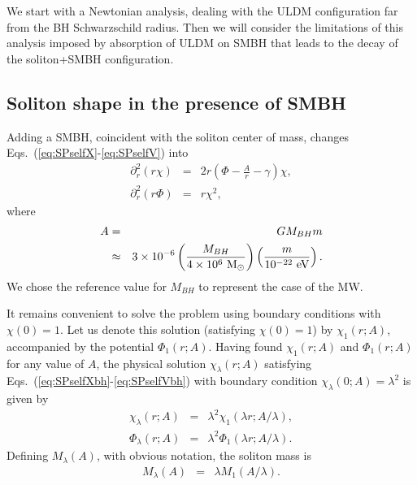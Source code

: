 \documentclass[aps,prd,floats,superscriptaddress,showpacs,nofootinbib,twocolumn,preprintnumbers]{revtex4-1}%
\def\be{\begin{eqnarray}}
\def\ee{\end{eqnarray}}
\def\no{\nonumber}
\begin{document}
\begin{appendix}
We start with a Newtonian analysis, dealing with the ULDM configuration
far from the BH Schwarzschild radius. Then we will consider the
limitations of this analysis imposed by absorption of ULDM on SMBH
that leads to the decay of the soliton+SMBH configuration.


\subsection{Soliton shape in the presence of SMBH }\label{ss:Newtonian}

Adding a SMBH, coincident with the soliton center of mass, changes Eqs.~(\ref{eq:SPselfX}-\ref{eq:SPselfV}) into
%
\be\partial_r^2\left(r\chi\right)&=&2r\left(\Phi-\frac{A}{r}-\gamma\right)\chi,\label{eq:SPselfXbh}\\
\partial_r^2\left(r\Phi\right)&=&r\chi^2\label{eq:SPselfVbh},\ee
%
where
%
\be A&=&GM_{BH}m\\
&\approx&3\times10^{-6}\left(\frac{M_{BH}}{4\times10^6~\rm M_\odot}\right)\left(\frac{m}{10^{-22}~\rm eV}\right).\no\ee
%
We chose the reference value for $M_{BH}$ to represent the case of the MW.

It remains convenient to solve the problem using boundary conditions
with $\chi(0)=1$.  
Let us denote this solution (satisfying $\chi(0)=1$) by $\chi_1(r;A)$, accompanied by the potential $\Phi_1(r;A)$. Having found $\chi_1(r;A)$ and $\Phi_1(r;A)$ for any value of $A$, the physical solution $\chi_\lambda(r;A)$ satisfying Eqs.~(\ref{eq:SPselfXbh}-\ref{eq:SPselfVbh}) with boundary condition $\chi_\lambda(0;A)=\lambda^2$ is given by 
%
\be
\chi_\lambda(r;A)&=&\lambda^2\chi_1(\lambda r;A/\lambda), 
\label{eq:solbh1}\\
\Phi_\lambda(r;A)&=&\lambda^2\Phi_1(\lambda r;A/\lambda).
\label{eq:solbh2}
\ee
%
Defining $M_\lambda(A)$, with obvious notation, the soliton mass is
%
\be M_\lambda(A)&=&\lambda M_1(A/\lambda).\ee
%


\end{appendix}
\end{document}

